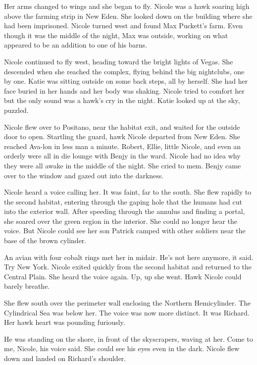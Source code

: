\documentclass[]{article}
\begin{document}
{{Her arms changed to wings and she began to fly.  Nicole was a hawk soaring high above the farming strip in New Eden.  She looked down on the building where she had been imprisoned.  Nicole turned west and found Max Puckett’s farm.  Even though it was the middle of the night, Max was outside, working on what appeared to be an addition to one of his barns.

Nicole continued to fly west, heading toward the bright lights of Vegas.  She descended when she reached the complex, flying behind the big nightclubs, one by one.  Katie was sitting outside on some back steps, all by herself.  She had her face buried in her hands and her body was shaking.  Nicole tried to comfort her but the only sound was a hawk’s cry in the night.  Katie looked up at the sky, puzzled.

Nicole flew over to Positano, near the habitat exit, and waited for the outside door to open.  Startling the guard, hawk Nicole departed from New Eden.  She reached Ava-lon in less man a minute.  Robert, Ellie, little Nicole, and even an orderly were all in die lounge with Benjy in the ward.  Nicole had no idea why they were all awake in the middle of the night.  She cried to mem.  Benjy came over to the window and gazed out into the darkness.

Nicole heard a voice calling her.  It was faint, far to the south.  She flew rapidly to the second habitat, entering through the gaping hole that the humans had cut into the exterior wall.  After speeding through the annulus and finding a portal, she soared over the green region in the interior.  She could no longer hear the voice.  But Nicole could see her son Patrick camped with other soldiers near the base of the brown cylinder.

An avian with four cobalt rings met her in midair.  He’s not here anymore, it said.  Try New York.  Nicole exited quickly from the second habitat and returned to the Central Plain.  She heard the voice again.  Up, up she went.  Hawk Nicole could barely breathe.

She flew south over the perimeter wall enclosing the Northern Hemicylinder.  The Cylindrical Sea was below her.  The voice was now more distinct.  It was Richard.  Her hawk heart was pounding furiously.

He was standing on the shore, in front of the skyscrapers, waving at her.  Come to me, Nicole, his voice said.  She could see his eyes even in the dark.  Nicole flew down and landed on Richard’s shoulder.

}}
\end{document}
